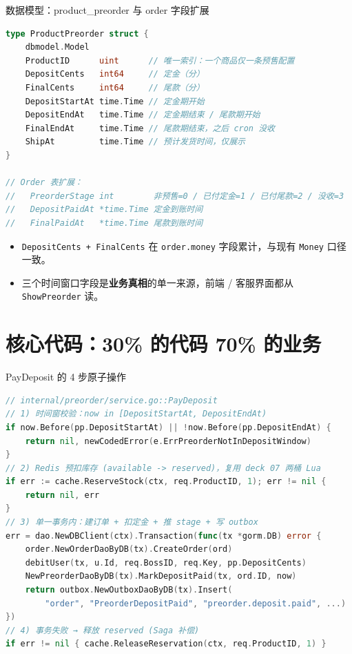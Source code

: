 \documentclass[aspectratio=169,11pt]{beamer}
\begin{document}
\begin{frame}{数据模型：product\_preorder 与 order 字段扩展}
\begin{lstlisting}[language=Go]
type ProductPreorder struct {
    dbmodel.Model
    ProductID      uint      // 唯一索引：一个商品仅一条预售配置
    DepositCents   int64     // 定金（分）
    FinalCents     int64     // 尾款（分）
    DepositStartAt time.Time // 定金期开始
    DepositEndAt   time.Time // 定金期结束 / 尾款期开始
    FinalEndAt     time.Time // 尾款期结束，之后 cron 没收
    ShipAt         time.Time // 预计发货时间，仅展示
}

// Order 表扩展：
//   PreorderStage int        非预售=0 / 已付定金=1 / 已付尾款=2 / 没收=3
//   DepositPaidAt *time.Time 定金到账时间
//   FinalPaidAt   *time.Time 尾款到账时间
\end{lstlisting}
\vspace{1mm}
\begin{itemize}\small
  \item \texttt{DepositCents + FinalCents} 在 \texttt{order.money} 字段累计，与现有 \texttt{Money} 口径一致。
  \item 三个时间窗口字段是\textbf{业务真相}的单一来源，前端 / 客服界面都从 \texttt{ShowPreorder} 读。
\end{itemize}
\end{frame}

\section{核心代码：30\% 的代码 70\% 的业务}

\begin{frame}{PayDeposit 的 4 步原子操作}
\begin{lstlisting}[language=Go]
// internal/preorder/service.go::PayDeposit
// 1) 时间窗校验：now in [DepositStartAt, DepositEndAt)
if now.Before(pp.DepositStartAt) || !now.Before(pp.DepositEndAt) {
    return nil, newCodedError(e.ErrPreorderNotInDepositWindow)
}
// 2) Redis 预扣库存 (available -> reserved)，复用 deck 07 两桶 Lua
if err := cache.ReserveStock(ctx, req.ProductID, 1); err != nil {
    return nil, err
}
// 3) 单一事务内：建订单 + 扣定金 + 推 stage + 写 outbox
err = dao.NewDBClient(ctx).Transaction(func(tx *gorm.DB) error {
    order.NewOrderDaoByDB(tx).CreateOrder(ord)
    debitUser(tx, u.Id, req.BossID, req.Key, pp.DepositCents)
    NewPreorderDaoByDB(tx).MarkDepositPaid(tx, ord.ID, now)
    return outbox.NewOutboxDaoByDB(tx).Insert(
        "order", "PreorderDepositPaid", "preorder.deposit.paid", ...)
})
// 4) 事务失败 → 释放 reserved (Saga 补偿)
if err != nil { cache.ReleaseReservation(ctx, req.ProductID, 1) }
\end{lstlisting}
\end{frame}
\end{document}
